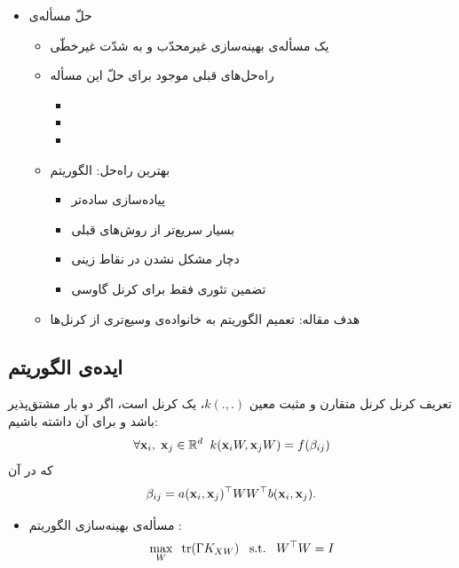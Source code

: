 \begin{rawslide}
	\begin{itemize}
		\item 
		حلّ مسأله‌ی
		\large{}\normalsize
		\begin{itemize}
			\item 
			یک مسأله‌ی بهینه‌سازی غیرمحدّب و به شدّت غیرخطّی
			\item 
			راه‌حل‌های قبلی موجود برای حلّ این مسأله
			\begin{itemize}
				\item \large{}\normalsize
				\item \large{}\normalsize
				\item \large{}\normalsize
			\end{itemize}  
			\item 
			بهترین راه‌حل: الگوریتم 
			\large{}\normalsize
			\begin{itemize}
				\item 
				پیاده‌سازی ساده‌تر
				\item 
				بسیار سریع‌تر از روش‌های قبلی
				\item 
				دچار مشکل‌ نشدن در نقاط زینی
				\item 
				تضمین تئوری فقط برای کرنل گاوسی
			\end{itemize}
		\item 
		هدف مقاله: تعمیم الگوریتم 
		\large{}\normalsize
		به خانواده‌ی وسیع‌تری از کرنل‌ها
		\end{itemize}
	\end{itemize}
\end{rawslide}
\begin{rawslide}
	\subsection{ایده‌ی الگوریتم
	\large{}\normalsize}		
		\begin{block}{تعریف کرنل‌
			\Large{}\normalsize
		}
			\label{ISM-def}
			کرنل متقارن و مثبت معین
			$k(., .)$،
			یک کرنل 
			است، اگر دو بار مشتق‌پذیر باشد و برای آن داشته باشیم:
			\begin{equation}
			\forall \mathbf{x}_i, \; \mathbf{x}_j \in \mathbb{R}^d \;\;
			k(\mathbf{x}_iW, \mathbf{x}_jW) = f(\beta_{ij})
			\end{equation}
			که در آن
			\begin{equation}
			\beta_{ij} = a(\mathbf{x}_i, \mathbf{x}_j)^\top WW^\top b(\mathbf{x}_i, \mathbf{x}_j).
			\end{equation}
		\end{block}
	\begin{itemize}
		\item 
		مسأله‌ی بهینه‌سازی الگوریتم
		\large{}\normalsize:
		\[\max_W \;\; \mathrm{tr}(\Gamma K_{XW})\;\;\;\mathrm{s.t.}\;\;\;W^\top W=I\]
	\end{itemize}
\end{rawslide}
